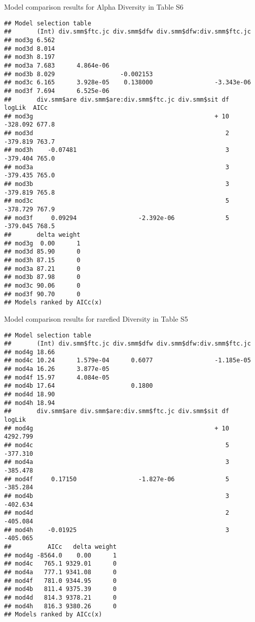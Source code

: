 \documentclass[]{article}
\begin{document}
Model comparison results for Alpha Diversity in Table S6

\begin{verbatim}
## Model selection table 
##       (Int) div.smm$ftc.jc div.smm$dfw div.smm$dfw:div.smm$ftc.jc
## mod3g 6.562                                                      
## mod3d 8.014                                                      
## mod3h 8.197                                                      
## mod3a 7.683      4.864e-06                                       
## mod3b 8.029                  -0.002153                           
## mod3c 6.165      3.928e-05    0.138000                 -3.343e-06
## mod3f 7.694      6.525e-06                                       
##       div.smm$are div.smm$are:div.smm$ftc.jc div.smm$sit df   logLik  AICc
## mod3g                                                  + 10 -328.092 677.8
## mod3d                                                     2 -379.819 763.7
## mod3h    -0.07481                                         3 -379.404 765.0
## mod3a                                                     3 -379.435 765.0
## mod3b                                                     3 -379.819 765.8
## mod3c                                                     5 -378.729 767.9
## mod3f     0.09294                 -2.392e-06              5 -379.045 768.5
##       delta weight
## mod3g  0.00      1
## mod3d 85.90      0
## mod3h 87.15      0
## mod3a 87.21      0
## mod3b 87.98      0
## mod3c 90.06      0
## mod3f 90.70      0
## Models ranked by AICc(x)
\end{verbatim}

Model comparison results for rarefied Diversity in Table S5

\begin{verbatim}
## Model selection table 
##       (Int) div.smm$ftc.jc div.smm$dfw div.smm$dfw:div.smm$ftc.jc
## mod4g 18.66                                                      
## mod4c 10.24      1.579e-04      0.6077                 -1.185e-05
## mod4a 16.26      3.877e-05                                       
## mod4f 15.97      4.084e-05                                       
## mod4b 17.64                     0.1800                           
## mod4d 18.90                                                      
## mod4h 18.94                                                      
##       div.smm$are div.smm$are:div.smm$ftc.jc div.smm$sit df   logLik
## mod4g                                                  + 10 4292.799
## mod4c                                                     5 -377.310
## mod4a                                                     3 -385.478
## mod4f     0.17150                 -1.827e-06              5 -385.284
## mod4b                                                     3 -402.634
## mod4d                                                     2 -405.084
## mod4h    -0.01925                                         3 -405.065
##          AICc   delta weight
## mod4g -8564.0    0.00      1
## mod4c   765.1 9329.01      0
## mod4a   777.1 9341.08      0
## mod4f   781.0 9344.95      0
## mod4b   811.4 9375.39      0
## mod4d   814.3 9378.21      0
## mod4h   816.3 9380.26      0
## Models ranked by AICc(x)
\end{verbatim}
\end{document}

